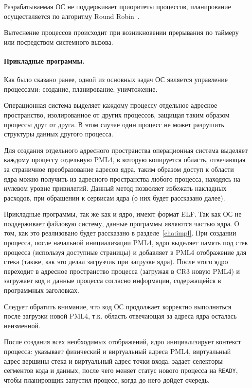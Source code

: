 Разрабатываемая ОС не поддерживает приоритеты процессов, планирование осуществляется
по алгоритму Round Robin~\cite{tanenbaum}.

Вытеснение процессов происходит при возникновении прерывания по таймеру или посредством
системного вызова.

\paragraph{Прикладные программы.}
Как было сказано ранее, одной из основных задач ОС является управление процессами: создание,
планирование, уничтожение.

Операционная система выделяет каждому процессу отдельное адресное пространство, изолированное
от других процессов, защищая таким образом процессы друг от друга. В этом случае один процесс
не может разрушить структуры данных другого процесса.

Для создания отдельного адресного пространства операционная система выделяет каждому процессу
отдельную PML4, в которую копируется область, отвечающая за страничное преобразование адресов
ядра, таким образом доступ к области ядра можно получить из адресного пространства любого процесса,
находясь на нулевом уровне привилегий. Данный метод позволяет избежать накладных расходов, при
обращении к сервисам ядра (о них будет рассказано далее).

Прикладные программы, так же как и ядро, имеют формат ELF. Так как ОС не поддерживает файловую
систему, данные программы являются частью ядра. О том, как это реализовано будет рассказано в
разделе~\ref{cha:impl}. При создании процесса, после начальной инициализации PML4, ядро выделяет
память под стек процесса (используя доступные страницы) и добавляет в PML4 отображение для стека (также,
как это делал загрузчик при загрузке ядра). После этого ядро переходит в адресное пространство
процесса (загружая в CR3 новую PML4) и загружает код и данные процесса согласно информации,
содержащейся в программных заголовках.

Следует обратить внимание, что код ОС продолжает корректно выполняться после загрузки новой PML4,
т.к. область отвечающая за адреса ядра осталась неизменной.

После создания всех необходимых отображений, ядро инициализирует контекст процесса: указывает
физический и виртуальный адреса PML4, виртуальный адрес вершины стека и виртуальный адрес
точки входа, задает селекторы сегментов кода и данных, после чего меняет статус нового процесса
на \texttt{READY}, чтобы планировщик запустил процесс, когда до него дойдет очередь.

